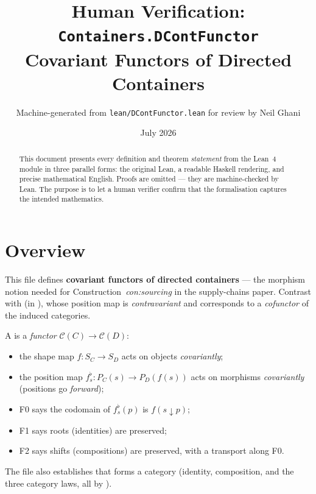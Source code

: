 \documentclass[11pt,a4paper]{article}
\title{Human Verification: \texttt{Containers.DContFunctor}\\[4pt]
  \large Covariant Functors of Directed Containers}
\author{Machine-generated from \texttt{lean/DContFunctor.lean} for review by Neil Ghani}
\date{July 2026}
\begin{document}
\maketitle

\begin{abstract}
This document presents every definition and theorem \emph{statement} from the
Lean~4 module  in three parallel forms: the
original Lean, a readable Haskell rendering, and precise mathematical English.
Proofs are omitted --- they are machine-checked by Lean.  The purpose is to
let a human verifier confirm that the formalisation captures the intended
mathematics.
\end{abstract}

\tableofcontents
\bigskip

\section{Overview}

This file defines \textbf{covariant functors of directed containers} --- the
morphism notion needed for Construction~\emph{con:sourcing} in the supply-chains
paper.  Contrast with  (in ),
whose position map is \emph{contravariant} and corresponds to a \emph{cofunctor}
of the induced categories.

A  is a \emph{functor} $\mathcal{C}(C) \to \mathcal{C}(D)$:
\begin{itemize}
  \item the shape map $f : S_C \to S_D$ acts on objects \emph{covariantly};
  \item the position map $f^\flat_s : P_C(s) \to P_D(f(s))$ acts on morphisms
        \emph{covariantly} (positions go \emph{forward});
  \item F0 says the codomain of $f^\flat_s(p)$ is $f(s \downarrow p)$;
  \item F1 says roots (identities) are preserved;
  \item F2 says shifts (compositions) are preserved, with a transport along F0.
\end{itemize}

The file also establishes that  forms a category (identity,
composition, and the three category laws, all by ).

\end{document}
